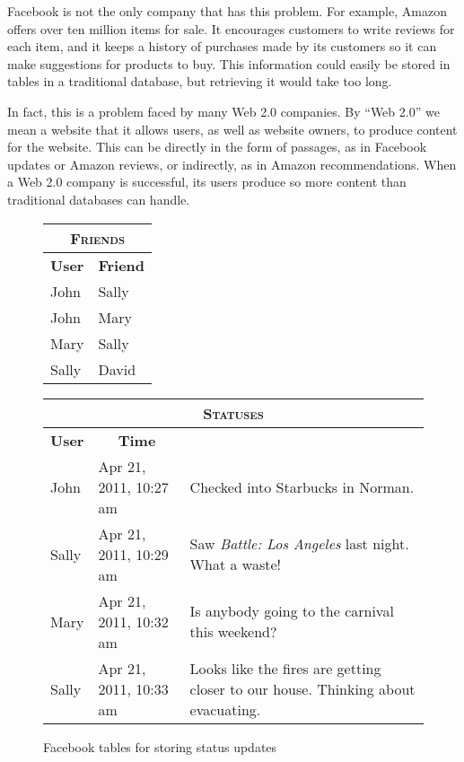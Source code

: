 Facebook is not the only company that has this problem.  For example, Amazon offers over ten
million items for sale.  It encourages customers to write reviews for each item, and it keeps a history
of purchases made by its customers so it can make suggestions for products to buy.  This information
could easily be stored in tables in a traditional database, but retrieving it would take too long.

In fact, this is a problem faced by many Web 2.0 companies.  By ``Web 2.0'' we mean a website that it allows users, as well as website owners, to produce content for the website.
This can be directly in the form of passages, as in
Facebook updates or Amazon reviews, or indirectly, as in Amazon recommendations.  
When a Web 2.0 company is successful,
its users produce so more content than traditional databases can handle.

\begin{figure}
	\begin{center}
		\begin{tabular}[t]{ll}
			\hline
			\multicolumn{2}{c}{\textsc{Friends}} \\
			\hline
			\multicolumn{1}{c}{\textbf{User}} & \multicolumn{1}{c}{\textbf{Friend}} \\
			\hline
			John  & Sally \\
			John  & Mary \\
			Mary  & Sally \\
			Sally & David \\
			\hline
		\end{tabular}
		\hspace{.5in}
		\begin{tabular}[t]{ll>{\raggedright}p{1in}}
			\hline
			\multicolumn{3}{c}{\textsc{Statuses}} \\
			\hline
			\multicolumn{1}{c}{\textbf{User}} & \multicolumn{1}{c}{\textbf{Time}} & \multicolumn{1}{c}{\textbf{Status}} \\
			\hline
			John  & Apr 21, 2011, 10:27 am & Checked into Starbucks in Norman. \tabularnewline
			Sally & Apr 21, 2011, 10:29 am & Saw \emph{Battle: Los Angeles} last night.  What a waste! \tabularnewline
			Mary  & Apr 21, 2011, 10:32 am & Is anybody going to the carnival this weekend? \tabularnewline
			Sally & Apr 21, 2011, 10:33 am & Looks like the fires are getting closer to our house.  Thinking about evacuating. \tabularnewline
			\hline
		\end{tabular}
	\end{center}
	\caption{Facebook tables for storing status updates}
	\label{facebook-tables}
\end{figure}


